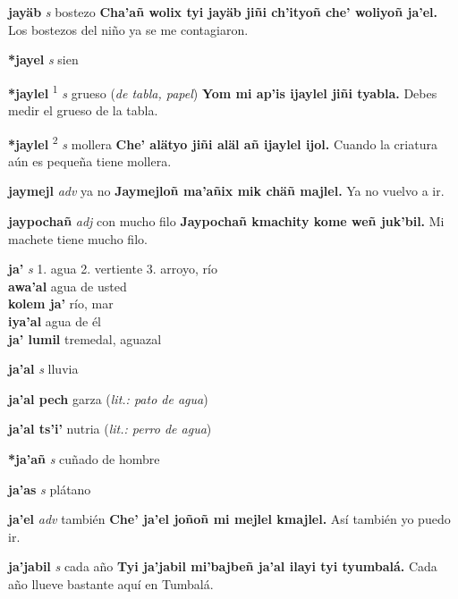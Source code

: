 \documentclass[10pt]{scrbook}
\newcommand{\entry}[1]{\textbf{#1}}
\newcommand{\onedefinition}[1]{#1.}
\newcommand{\defsuperscript}[1]{\textsuperscript{#1}}
\newcommand{\partofspeech}[1]{\textit{#1}}
\newcommand{\spanishtranslation}[1]{#1}
\newcommand{\clarification}[1]{(\textit{#1})}
\newcommand{\cholexample}[1]{\textbf{#1}}
\newcommand{\exampletranslation}[1]{#1}
\newcommand{\secondaryentry}[1]{\\\textbf{#1}}
\newcommand{\secondtranslation}[1]{#1}
\begin{document}
\begin{multicols}{2}
\entry{jayäb}
\partofspeech{s}
\spanishtranslation{bostezo}
\cholexample{Cha'añ wolix tyi jayäb jiñi ch'ityoñ che' woliyoñ ja'el.}
\exampletranslation{Los bostezos del niño ya se me contagiaron.}

\entry{*jayel}
\partofspeech{s}
\spanishtranslation{sien}

\entry{*jaylel}
\defsuperscript{1}
\partofspeech{s}
\spanishtranslation{grueso}
\clarification{de tabla, papel}
\cholexample{Yom mi ap'is ijaylel jiñi tyabla.}
\exampletranslation{Debes medir el grueso de la tabla.}

\entry{*jaylel}
\defsuperscript{2}
\partofspeech{s}
\spanishtranslation{mollera}
\cholexample{Che' alätyo jiñi aläl añ ijaylel ijol.}
\exampletranslation{Cuando la criatura aún es pequeña tiene mollera.}

\entry{jaymejl}
\partofspeech{adv}
\spanishtranslation{ya no}
\cholexample{Jaymejloñ ma'añix mik chäñ majlel.}
\exampletranslation{Ya no vuelvo a ir.}

\entry{jaypochañ}
\partofspeech{adj}
\spanishtranslation{con mucho filo}
\cholexample{Jaypochañ kmachity kome weñ juk'bil.}
\exampletranslation{Mi machete tiene mucho filo.}

\entry{ja'}
\partofspeech{s}
\onedefinition{1}
\spanishtranslation{agua}
\onedefinition{2}
\spanishtranslation{vertiente}
\onedefinition{3}
\spanishtranslation{arroyo, río}
\secondaryentry{awa'al}
\secondtranslation{agua de usted}
\secondaryentry{kolem ja'}
\secondtranslation{río, mar}
\secondaryentry{iya'al}
\secondtranslation{agua de él}
\secondaryentry{ja' lumil}
\secondtranslation{tremedal, aguazal}

\entry{ja'al}
\partofspeech{s}
\spanishtranslation{lluvia}

\entry{ja'al pech}
\spanishtranslation{garza}
\clarification{lit.: pato de agua}

\entry{ja'al ts'i'}
\spanishtranslation{nutria}
\clarification{lit.: perro de agua}

\entry{*ja'añ}
\partofspeech{s}
\spanishtranslation{cuñado de hombre}

\entry{ja'as}
\partofspeech{s}
\spanishtranslation{plátano}

\entry{ja'el}
\partofspeech{adv}
\spanishtranslation{también}
\cholexample{Che' ja'el joñoñ mi mejlel kmajlel.}
\exampletranslation{Así también yo puedo ir.}

\entry{ja'jabil}
\partofspeech{s}
\spanishtranslation{cada año}
\cholexample{Tyi ja'jabil mi'bajbeñ ja'al ilayi tyi tyumbalá.}
\exampletranslation{Cada año llueve bastante aquí en Tumbalá.}


\end{multicols}
\end{document}
